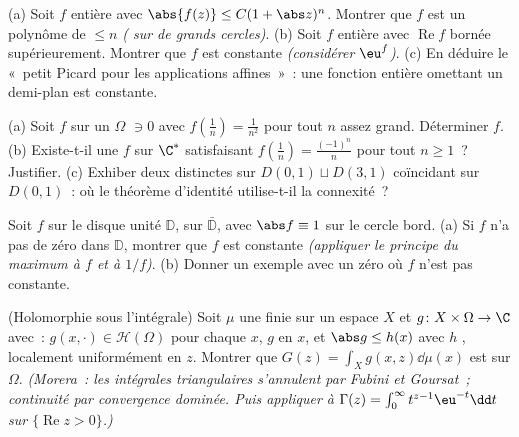 \begin{exercise}[$\star\star$]\label{exo:b3:holomorphic:4}
(a) Soit $f$ entière avec $\abs{f(z)} \leq C(1 + \abs z)^{n}$.
Montrer que $f$ est un polynôme de  $\leq n$
\emph{( sur de grands cercles)}.
(b) Soit $f$ entière avec $\operatorname{Re}f$ bornée
supérieurement. Montrer que $f$ est constante \emph{(considérer
$\eu^{f}$)}.
(c) En déduire le «~petit Picard pour les applications
affines~»~: une fonction entière omettant un demi-plan est
constante.
\end{exercise}

\begin{exercise}[$\star\star$]\label{exo:b3:holomorphic:5}
(a) Soit $f$  sur un $\Omega$  $\ni 0$ avec
$f(\frac1n) = \frac1{n^2}$ pour tout $n$ assez grand.
Déterminer $f$.
(b) Existe-t-il une $f$  sur $\C^*$ satisfaisant
$f(\frac1n) = \frac{(-1)^n}{n}$ pour tout $n \geq 1$~?
Justifier.
(c) Exhiber deux  distinctes sur
$D(0,1)\sqcup D(3,1)$ coïncidant sur $D(0,1)$~: où le théorème
d'identité utilise-t-il la connexité~?
\end{exercise}

\begin{exercise}[$\star\star$]\label{exo:b3:holomorphic:6}
Soit $f$  sur le disque unité  $\mathbb D$,
 sur $\bar{\mathbb D}$, avec $\abs f \equiv 1$ sur le
cercle bord.
(a) Si $f$ n'a pas de zéro dans $\mathbb D$, montrer que $f$
est constante \emph{(appliquer le principe du maximum à $f$ et
à $1/f$)}.
(b) Donner un exemple avec un zéro où $f$ n'est pas constante.
\end{exercise}

\begin{exercise}[$\star\star$]\label{exo:b3:holomorphic:7}
(Holomorphie sous l'intégrale) Soit $\mu$ une  finie sur
un espace $X$ et $g \colon X\times\Omega \to \C$ avec~: $g(x,
\cdot) \in \mathcal H(\Omega)$ pour chaque $x$, $g$ 
en $x$, et $\abs g \leq h(x)$ avec $h$ , localement
uniformément en $z$. Montrer que $G(z) = \int_Xg(x, z)\dd\mu(x)$
est  sur $\Omega$. \emph{(Morera~: les intégrales
triangulaires s'annulent par Fubini et Goursat~; continuité par
convergence dominée. Puis appliquer à $\Gamma(z) =
\int_0^\infty t^{z-1}\eu^{-t}\dd t$ sur $\{\operatorname{Re}z >
0\}$.)}
\end{exercise}

